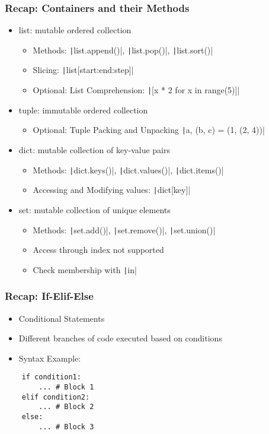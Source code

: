 \documentclass{beamer}
\begin{document}
\begin{frame}
    \frametitle{Recap: Containers and their Methods}
    \begin{itemize}
        \item list: mutable ordered collection
              \begin{itemize}
                  \item Methods: \texttt|list.append()|, \texttt|list.pop()|, \texttt|list.sort()|
                  \item Slicing: \texttt|list[start:end:step]|
                  \item Optional: List Comprehension: \texttt|[x * 2 for x in range(5)]|
              \end{itemize}
        \item tuple: immutable ordered collection
              \begin{itemize}
                  \item Optional: Tuple Packing and Unpacking \texttt|a, (b, c) = (1, (2, 4))|
              \end{itemize}
        \item dict: mutable collection of key-value pairs
              \begin{itemize}
                  \item Methods: \texttt|dict.keys()|, \texttt|dict.values()|, \texttt|dict.items()|
                  \item Accessing and Modifying values: \texttt|dict[key]|
              \end{itemize}
        \item set: mutable collection of unique elements
              \begin{itemize}
                  \item Methods: \texttt|set.add()|, \texttt|set.remove()|, \texttt|set.union()|
                  \item Access through index not supported
                  \item Check membership with \texttt|in|
              \end{itemize}
    \end{itemize}
\end{frame}


\begin{frame}[fragile]
    \frametitle{Recap: If-Elif-Else}
    \begin{itemize}
        \item Conditional Statements
        \item Different branches of code executed based on conditions
        \item Syntax Example:
    \end{itemize}

    \begin{verbatim}
    if condition1:
        ... # Block 1
    elif condition2:
        ... # Block 2
    else:
        ... # Block 3
    \end{verbatim}
\end{frame}
\end{document}
